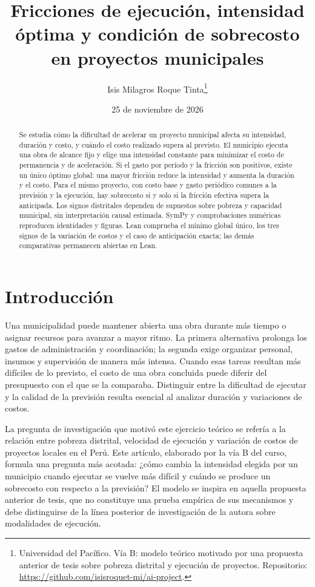 \documentclass[11pt]{article}
\title{Fricciones de ejecución, intensidad óptima y condición de sobrecosto en proyectos municipales}
\author{Isis Milagros Roque Tinta\thanks{Universidad del Pacífico. Vía B: modelo teórico motivado por una propuesta anterior de tesis sobre pobreza distrital y ejecución de proyectos. Repositorio: \url{https://github.com/isisroquet-mi/ai-project}.}}
\date{25 de noviembre de 2026}
\renewcommand{\proofname}{Demostración}
\begin{document}
\renewcommand{\abstractname}{Resumen}
\renewcommand{\refname}{Referencias}
\renewcommand{\proofname}{Demostración}
\maketitle
\begin{abstract}
\noindent Se estudia cómo la dificultad de acelerar un proyecto municipal afecta su intensidad, duración y costo, y cuándo el costo realizado supera al previsto. El municipio ejecuta una obra de alcance fijo y elige una intensidad constante para minimizar el costo de permanencia y de aceleración. Si el gasto por período y la fricción son positivos, existe un único óptimo global: una mayor fricción reduce la intensidad y aumenta la duración y el costo. Para el mismo proyecto, con costo base y gasto periódico comunes a la previsión y la ejecución, hay sobrecosto si y solo si la fricción efectiva supera la anticipada. Los signos distritales dependen de supuestos sobre pobreza y capacidad municipal, sin interpretación causal estimada. SymPy y comprobaciones numéricas reproducen identidades y figuras. Lean comprueba el mínimo global único, los tres signos de la variación de costos y el caso de anticipación exacta; las demás comparativas permanecen abiertas en Lean.
\end{abstract}

\section{Introducción}\label{sec:intro}
Una municipalidad puede mantener abierta una obra durante más tiempo o asignar recursos para avanzar a mayor ritmo. La primera alternativa prolonga los gastos de administración y coordinación; la segunda exige organizar personal, insumos y supervisión de manera más intensa. Cuando esas tareas resultan más difíciles de lo previsto, el costo de una obra concluida puede diferir del presupuesto con el que se la comparaba. Distinguir entre la dificultad de ejecutar y la calidad de la previsión resulta esencial al analizar duración y variaciones de costos.

La pregunta de investigación que motivó este ejercicio teórico se refería a la relación entre pobreza distrital, velocidad de ejecución y variación de costos de proyectos locales en el Perú. Este artículo, elaborado por la vía B del curso, formula una pregunta más acotada: ¿cómo cambia la intensidad elegida por un municipio cuando ejecutar se vuelve más difícil y cuándo se produce un sobrecosto con respecto a la previsión? El modelo se inspira en aquella propuesta anterior de tesis, que no constituye una prueba empírica de sus mecanismos y debe distinguirse de la línea posterior de investigación de la autora sobre modalidades de ejecución.
\end{document}
